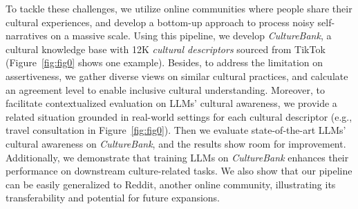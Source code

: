 \documentclass{article} %
\newcommand{\dataname}{\textit{CultureBank}\xspace}
\begin{document}


To tackle these challenges, we utilize online communities where  people share their cultural experiences, and develop a bottom-up approach to process noisy self-narratives on a massive scale. Using this pipeline, we develop \dataname, a cultural knowledge base with 12K \emph{cultural descriptors} sourced from TikTok (Figure~\ref{fig:fig0} shows one example). %
Besides, to address the limitation on assertiveness, we gather diverse views on similar cultural practices, and 
calculate an agreement level to enable inclusive cultural understanding.
Moreover, to facilitate contextualized evaluation on LLMs' cultural awareness, we provide a related situation grounded in real-world settings for each cultural descriptor (e.g., travel consultation in Figure~\ref{fig:fig0}). %
Then we evaluate state-of-the-art LLMs' cultural awareness on \dataname, and the results show room for improvement. Additionally, we demonstrate that training LLMs on \dataname enhances their performance on downstream culture-related tasks. We also show that our pipeline can be easily generalized to Reddit, another online community, illustrating its transferability and potential for future expansions.
\end{document}
